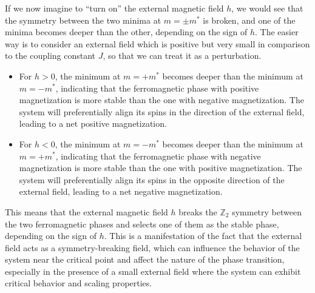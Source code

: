 If we now imagine to ``turn on'' the external magnetic field \(h\), we would see that the symmetry between the two minima at \(m = \pm m^*\) is broken, and one of the minima becomes deeper than the other, depending on the sign of \(h\). The easier way is to consider an external field which is positive but very small in comparison to the coupling constant \(J\), so that we can treat it as a perturbation.
\begin{itemize}
    \item For \(h > 0\), the minimum at \(m = +m^*\) becomes deeper than the minimum at \(m = -m^*\), indicating that the ferromagnetic phase with positive magnetization is more stable than the one with negative magnetization. The system will preferentially align its spins in the direction of the external field, leading to a net positive magnetization.
    \item For \(h < 0\), the minimum at \(m = -m^*\) becomes deeper than the minimum at \(m = +m^*\), indicating that the ferromagnetic phase with negative magnetization is more stable than the one with positive magnetization. The system will preferentially align its spins in the opposite direction of the external field, leading to a net negative magnetization.
\end{itemize}
This means that the external magnetic field \(h\) breaks the \(\mathbb{Z}_2\) symmetry between the two ferromagnetic phases and selects one of them as the stable phase, depending on the sign of \(h\). This is a manifestation of the fact that the external field acts as a symmetry-breaking field, which can influence the behavior of the system near the critical point and affect the nature of the phase transition, especially in the presence of a small external field where the system can exhibit critical behavior and scaling properties.

